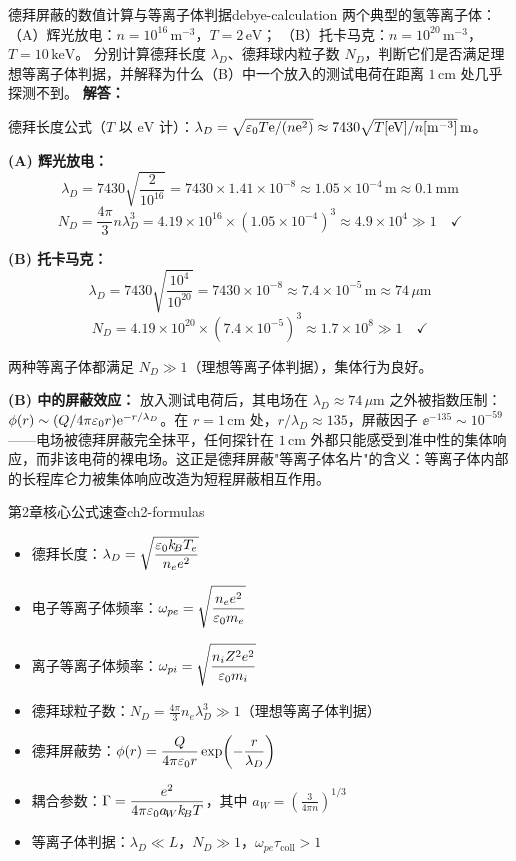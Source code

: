 \begin{example}{德拜屏蔽的数值计算与等离子体判据}{debye-calculation}
两个典型的氢等离子体：
（A）辉光放电：$n=10^{16}\,\mathrm{m^{-3}}$，$T=2\,\mathrm{eV}$；
（B）托卡马克：$n=10^{20}\,\mathrm{m^{-3}}$，$T=10\,\mathrm{keV}$。
分别计算德拜长度 $\lambda_D$、德拜球内粒子数 $N_D$，判断它们是否满足理想等离子体判据，并解释为什么（B）中一个放入的测试电荷在距离 $1\,\mathrm{cm}$ 处几乎探测不到。
\tcblower
\textbf{解答：}

德拜长度公式（$T$ 以 $\mathrm{eV}$ 计）：$\lambda_D = \sqrt{\varepsilon_0 T\mathrm{e}/(n\mathrm{e}^2)} \approx 7430\sqrt{T[\mathrm{eV}]/n[\mathrm{m^{-3}}]}\,\mathrm{m}$。

\textbf{(A) 辉光放电：}
\[
\lambda_D = 7430\sqrt{\frac{2}{10^{16}}} = 7430\times1.41\times10^{-8} \approx 1.05\times10^{-4}\,\mathrm{m} \approx 0.1\,\mathrm{mm}
\]
\[
N_D = \frac{4\pi}{3}n\lambda_D^3 = 4.19\times10^{16}\times(1.05\times10^{-4})^3 \approx 4.9\times10^4 \gg 1 \quad\checkmark
\]

\textbf{(B) 托卡马克：}
\[
\lambda_D = 7430\sqrt{\frac{10^4}{10^{20}}} = 7430\times10^{-8} \approx 7.4\times10^{-5}\,\mathrm{m} \approx 74\,\mu\mathrm{m}
\]
\[
N_D = 4.19\times10^{20}\times(7.4\times10^{-5})^3 \approx 1.7\times10^8 \gg 1 \quad\checkmark
\]

两种等离子体都满足 $N_D\gg1$（理想等离子体判据），集体行为良好。

\textbf{(B) 中的屏蔽效应：} 放入测试电荷后，其电场在 $\lambda_D\approx74\,\mu\mathrm{m}$ 之外被指数压制：$\phi(r)\sim (Q/4\pi\varepsilon_0 r)\mathrm{e}^{-r/\lambda_D}$。在 $r=1\,\mathrm{cm}$ 处，$r/\lambda_D \approx 135$，屏蔽因子 $\ee^{-135}\sim10^{-59}$——电场被德拜屏蔽完全抹平，任何探针在 $1\,\mathrm{cm}$ 外都只能感受到准中性的集体响应，而非该电荷的裸电场。这正是德拜屏蔽"等离子体名片"的含义：等离子体内部的长程库仑力被集体响应改造为短程屏蔽相互作用。
\end{example}

\begin{formulabox}{第2章核心公式速查}{ch2-formulas}
\begin{itemize}[leftmargin=*,itemsep=0pt]
\item 德拜长度：$\displaystyle\lambda_D = \sqrt{\frac{\varepsilon_0 k_{\!B}T_e}{n_e e^2}}$
\item 电子等离子体频率：$\displaystyle\omega_{pe} = \sqrt{\frac{n_e e^2}{\varepsilon_0 m_e}}$
\item 离子等离子体频率：$\displaystyle\omega_{pi} = \sqrt{\frac{n_i Z^2 e^2}{\varepsilon_0 m_i}}$
\item 德拜球粒子数：$\displaystyle N_D = \frac{4\pi}{3} n_e \lambda_D^3 \gg 1$（理想等离子体判据）
\item 德拜屏蔽势：$\displaystyle\phi(r) = \frac{Q}{4\pi\varepsilon_0 r}\exp\!\left(-\frac{r}{\lambda_D}\right)$
\item 耦合参数：$\displaystyle\Gamma = \frac{e^2}{4\pi\varepsilon_0 a_{\!W}k_{\!B}T}$，其中 $a_{\!W}=\left(\frac{3}{4\pi n}\right)^{1/3}$
\item 等离子体判据：$\lambda_D\ll L$，$N_D\gg 1$，$\omega_{pe}\tau_{\text{coll}}>1$
\end{itemize}
\end{formulabox}

